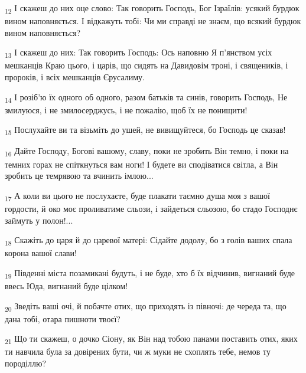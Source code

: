 \begin{tcolorbox}
\textsubscript{12} І скажеш до них оце слово: Так говорить Господь, Бог Ізраїлів: усякий бурдюк вином наповняється. І відкажуть тобі: Чи ми справді не знаєм, що всякий бурдюк вином наповняється?
\end{tcolorbox}
\begin{tcolorbox}
\textsubscript{13} І скажеш до них: Так говорить Господь: Ось наповню Я п'янством усіх мешканців Краю цього, і царів, що сидять на Давидовім троні, і священиків, і пророків, і всіх мешканців Єрусалиму.
\end{tcolorbox}
\begin{tcolorbox}
\textsubscript{14} І розіб'ю їх одного об одного, разом батьків та синів, говорить Господь, Не змилуюся, і не змилосерджусь, і не пожалію, щоб їх не понищити!
\end{tcolorbox}
\begin{tcolorbox}
\textsubscript{15} Послухайте ви та візьміть до ушей, не вивищуйтеся, бо Господь це сказав!
\end{tcolorbox}
\begin{tcolorbox}
\textsubscript{16} Дайте Господу, Богові вашому, славу, поки не зробить Він темно, і поки на темних горах не спіткнуться вам ноги! І будете ви сподіватися світла, а Він зробить це темрявою та вчинить імлою...
\end{tcolorbox}
\begin{tcolorbox}
\textsubscript{17} А коли ви цього не послухаєте, буде плакати таємно душа моя з вашої гордости, й око моє проливатиме сльози, і зайдеться сльозою, бо стадо Господнє займуть у полон!...
\end{tcolorbox}
\begin{tcolorbox}
\textsubscript{18} Скажіть до царя й до царевої матері: Сідайте додолу, бо з голів ваших спала корона вашої слави!
\end{tcolorbox}
\begin{tcolorbox}
\textsubscript{19} Південні міста позамикані будуть, і не буде, хто б їх відчинив, вигнаний буде ввесь Юда, вигнаний буде цілком!
\end{tcolorbox}
\begin{tcolorbox}
\textsubscript{20} Зведіть ваші очі, й побачте отих, що приходять із півночі: де череда та, що дана тобі, отара пишноти твоєї?
\end{tcolorbox}
\begin{tcolorbox}
\textsubscript{21} Що ти скажеш, о дочко Сіону, як Він над тобою панами поставить отих, яких ти навчила була за довірених бути, чи ж муки не схоплять тебе, немов ту породіллю?
\end{tcolorbox}
